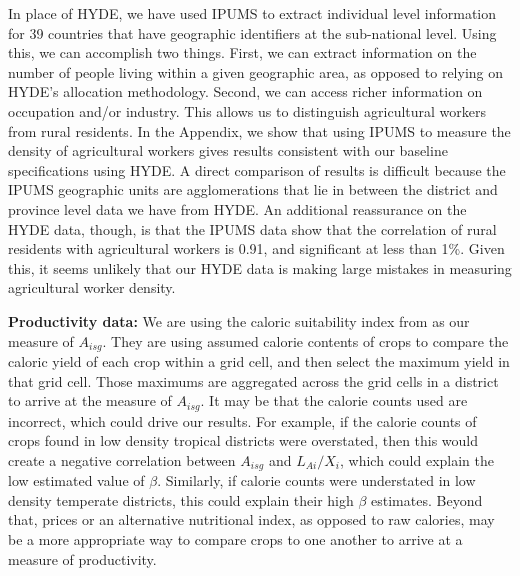 \documentclass[11pt]{article}
\begin{document}
In place of HYDE, we have used IPUMS \nocite{ipums} to extract individual level information for 39 countries that have geographic identifiers at the sub-national level. Using this, we can accomplish two things. First, we can extract information on the number of people living within a given geographic area, as opposed to relying on HYDE's allocation methodology. Second, we can access richer information on occupation and/or industry. This allows us to distinguish agricultural workers from rural residents. In the Appendix, we show that using IPUMS to measure the density of agricultural workers gives results consistent with our baseline specifications using HYDE. A direct comparison of results is difficult because the IPUMS geographic units are agglomerations that lie in between the district and province level data we have from HYDE. An additional reassurance on the HYDE data, though, is that the IPUMS data show that the correlation of rural residents with agricultural workers is 0.91, and significant at less than 1\%. Given this, it seems unlikely that our HYDE data is making large mistakes in measuring agricultural worker density.

\vspace{.5cm}\noindent\textbf{Productivity data:} We are using the caloric suitability index from \citet{galorozak2016} as our measure of $A_{isg}$. They are using assumed calorie contents of crops to compare the caloric yield of each crop within a grid cell, and then select the maximum yield in that grid cell. Those maximums are aggregated across the grid cells in a district to arrive at the measure of $A_{isg}$. It may be that the calorie counts used are incorrect, which could drive our results. For example, if the calorie counts of crops found in low density tropical districts were overstated, then this would create a negative correlation between $A_{isg}$ and $L_{Ai}/X_i$, which could explain the low estimated value of $\beta$. Similarly, if calorie counts were understated in low density temperate districts, this could explain their high $\beta$ estimates. Beyond that, prices or an alternative nutritional index, as opposed to raw calories, may be a more appropriate way to compare crops to one another to arrive at a measure of productivity. 
\end{document}
